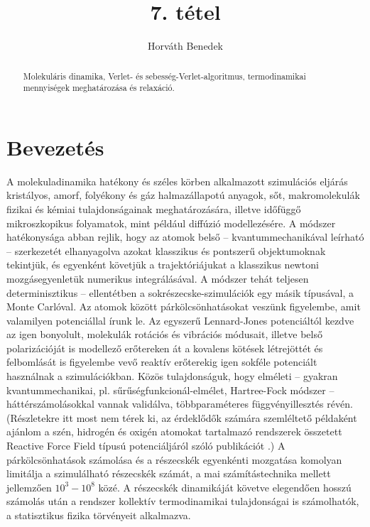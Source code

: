 \documentclass[12pt]{article}
\theoremstyle{plain}
\begin{document}
\title{7. tétel}
\author{Horváth Benedek}

\maketitle


\begin{abstract}
    Molekuláris dinamika, Verlet- és sebesség-Verlet-algoritmus, termodinamikai mennyiségek meghatározása és relaxáció.
\end{abstract}

\vfill

\tableofcontents

\newpage

\section{Bevezetés}

A molekuladinamika hatékony és széles körben alkalmazott szimulációs eljárás kristályos, amorf, folyékony és gáz halmazállapotú anyagok, sőt, makromolekulák fizikai és kémiai tulajdonságainak meghatározására, illetve időfüggő mikroszkopikus folyamatok, mint például diffúzió modellezésére. A módszer hatékonysága abban rejlik, hogy az atomok belső -- kvantummechanikával leírható -- szerkezetét elhanyagolva azokat klasszikus és pontszerű objektumoknak tekintjük, és egyenként követjük a trajektóriájukat a klasszikus newtoni mozgásegyenletük numerikus integrálásával. A módszer tehát teljesen determinisztikus -- ellentétben a sokrészecske-szimulációk egy másik típusával, a Monte Carlóval. Az atomok között párkölcsönhatásokat veszünk figyelembe, amit valamilyen potenciállal írunk le. Az egyszerű Lennard-Jones potenciáltól kezdve az igen bonyolult, molekulák rotációs és vibrációs módusait, illetve belső polarizációját is modellező erőtereken át a kovalens kötések létrejöttét és felbomlását is figyelembe vevő reaktív erőterekig igen sokféle potenciált használnak a szimulációkban. Közös tulajdonságuk, hogy elméleti -- gyakran kvantummechanikai, pl. sűrűségfunkcionál-elmélet, Hartree-Fock módszer -- háttérszámolásokkal vannak validálva, többparaméteres függvényillesztés révén. (Részletekre itt most nem térek ki, az érdeklődők számára szemléltető példaként ajánlom a szén, hidrogén és oxigén atomokat tartalmazó rendszerek összetett Reactive Force Field típusú potenciáljáról szóló publikációt \cite{KimberlyChenoweth2008}.) A párkölcsönhatások számolása és a részecskék egyenkénti mozgatása komolyan limitálja a szimulálható részecskék számát, a mai számítástechnika mellett jellemzően $10^3-10^8$ közé. A részecskék dinamikáját követve elegendően hosszú számolás után a rendszer kollektív termodinamikai tulajdonságai is számolhatók, a statisztikus fizika törvényeit alkalmazva.
\end{document}
